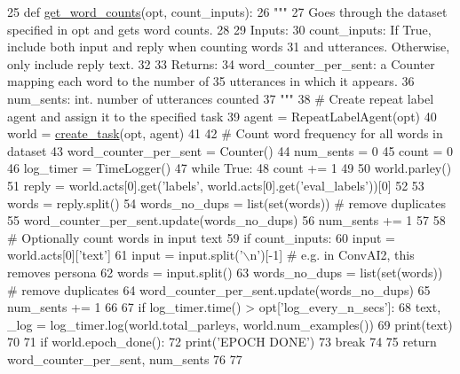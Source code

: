 \begin{DoxyCode}
25 \textcolor{keyword}{def }\hyperlink{namespaceprojects_1_1controllable__dialogue_1_1controllable__seq2seq_1_1nidf_ad06ddb173f03a586d8c47c0c40f2f00c}{get\_word\_counts}(opt, count\_inputs):
26     \textcolor{stringliteral}{"""}
27 \textcolor{stringliteral}{    Goes through the dataset specified in opt and gets word counts.}
28 \textcolor{stringliteral}{}
29 \textcolor{stringliteral}{    Inputs:}
30 \textcolor{stringliteral}{      count\_inputs: If True, include both input and reply when counting words}
31 \textcolor{stringliteral}{        and utterances. Otherwise, only include reply text.}
32 \textcolor{stringliteral}{}
33 \textcolor{stringliteral}{    Returns:}
34 \textcolor{stringliteral}{      word\_counter\_per\_sent: a Counter mapping each word to the number of}
35 \textcolor{stringliteral}{        utterances in which it appears.}
36 \textcolor{stringliteral}{      num\_sents: int. number of utterances counted}
37 \textcolor{stringliteral}{    """}
38     \textcolor{comment}{# Create repeat label agent and assign it to the specified task}
39     agent = RepeatLabelAgent(opt)
40     world = \hyperlink{namespaceparlai_1_1core_1_1worlds_a79969c7ba76d4b3c500f5bb776444dc6}{create\_task}(opt, agent)
41 
42     \textcolor{comment}{# Count word frequency for all words in dataset}
43     word\_counter\_per\_sent = Counter()
44     num\_sents = 0
45     count = 0
46     log\_timer = TimeLogger()
47     \textcolor{keywordflow}{while} \textcolor{keyword}{True}:
48         count += 1
49 
50         world.parley()
51         reply = world.acts[0].get(\textcolor{stringliteral}{'labels'}, world.acts[0].get(\textcolor{stringliteral}{'eval\_labels'}))[0]
52 
53         words = reply.split()
54         words\_no\_dups = list(set(words))  \textcolor{comment}{# remove duplicates}
55         word\_counter\_per\_sent.update(words\_no\_dups)
56         num\_sents += 1
57 
58         \textcolor{comment}{# Optionally count words in input text}
59         \textcolor{keywordflow}{if} count\_inputs:
60             input = world.acts[0][\textcolor{stringliteral}{'text'}]
61             input = input.split(\textcolor{stringliteral}{'\(\backslash\)n'})[-1]  \textcolor{comment}{# e.g. in ConvAI2, this removes persona}
62             words = input.split()
63             words\_no\_dups = list(set(words))  \textcolor{comment}{# remove duplicates}
64             word\_counter\_per\_sent.update(words\_no\_dups)
65             num\_sents += 1
66 
67         \textcolor{keywordflow}{if} log\_timer.time() > opt[\textcolor{stringliteral}{'log\_every\_n\_secs'}]:
68             text, \_log = log\_timer.log(world.total\_parleys, world.num\_examples())
69             print(text)
70 
71         \textcolor{keywordflow}{if} world.epoch\_done():
72             print(\textcolor{stringliteral}{'EPOCH DONE'})
73             \textcolor{keywordflow}{break}
74 
75     \textcolor{keywordflow}{return} word\_counter\_per\_sent, num\_sents
76 
77 
\end{DoxyCode}
